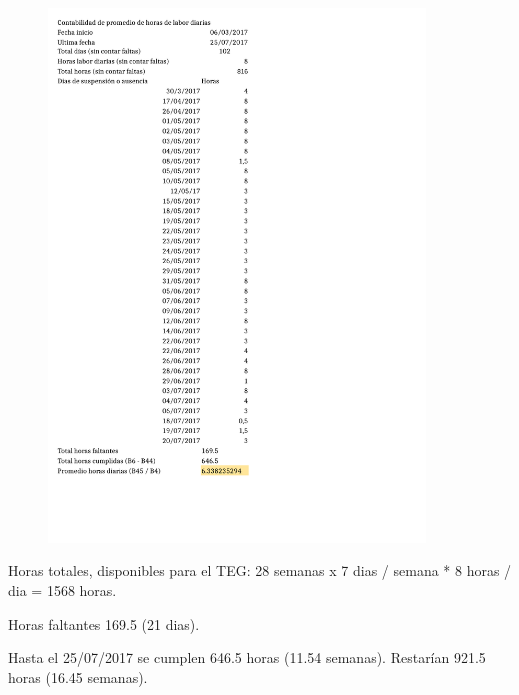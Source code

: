 \documentclass[paper=letter,oneside,fontsize=12pt, parskip=full]{article}
\begin{document}
		\begin{figure}[h!]
			\centering
			\includegraphics[width=10cm]{ContabilidadHorasPasantia.pdf}
		\end{figure}
	
		Horas totales, disponibles para el TEG: 28 semanas x 7 dias / semana * 8 horas / dia = 1568 horas.
		
		Horas faltantes 169.5 (21 dias). 
		
		Hasta el 25/07/2017 se cumplen 646.5 horas (11.54 semanas). Restarían 921.5 horas (16.45 semanas).		
\end{document}
